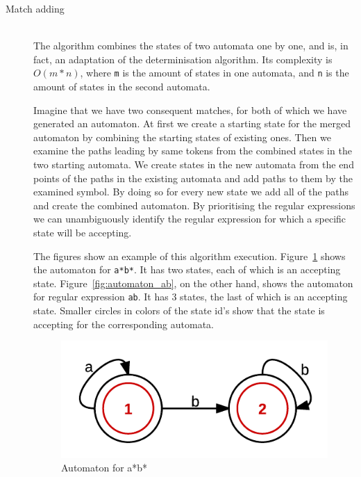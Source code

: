\begin{description}

\item[Match adding] \hfill \\

The algorithm combines the states of two automata one by one, and is, in fact,
an adaptation of the determinisation algorithm. Its complexity is $O(m*n)$,
where \verb/m/ is the amount of states in one automata, and \verb/n/ is the
amount of states in the second automata.

Imagine that we have two consequent matches, for both of which we have
generated an automaton. At first we create a starting state for the merged
automaton by combining the starting states of existing ones. Then we examine
the paths leading by same tokens from the combined states in the two starting
automata. We create states in the new automata from the end points of the paths
in the existing automata and add paths to them by the examined symbol. By doing
so for every new state we add all of the paths and create the combined
automaton. By prioritising the regular expressions we can unambiguously
identify the regular expression for which a specific state will be accepting.

The figures show an example of this algorithm execution.
Figure~\ref{fig:automaton_aastbast} shows the automaton for \verb/a*b*/. It has two
states, each of which is an accepting state. Figure~\ref{fig:automaton_ab}, on
the other hand, shows the automaton for regular expression \verb/ab/. It has 3
states, the last of which is an accepting state. Smaller circles in colors of
the state id's show that the state is accepting for the corresponding
automata.

\begin{figure}[h]
  \centering
    \includegraphics{automaton_2}
  \caption{Automaton for a*b*}
  \label{fig:automaton_aastbast}
\end{figure}


\end{description}
